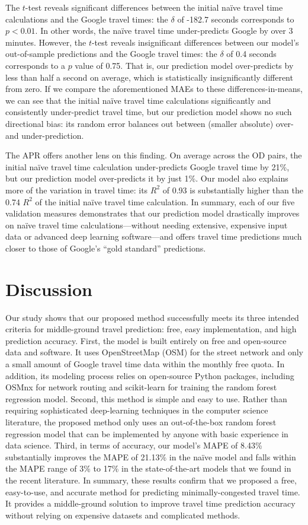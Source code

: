 \documentclass[12pt,letterpaper]{article} %
\begin{document}
    The $t$-test reveals significant differences between the initial naïve travel time calculations and the Google travel times: the $\delta$ of -182.7 seconds corresponds to $p<0.01$. In other words, the naïve travel time under-predicts Google by over 3 minutes. However, the $t$-test reveals insignificant differences between our model's out-of-sample predictions and the Google travel times: the $\delta$ of 0.4 seconds corresponds to a $p$ value of 0.75. That is, our prediction model over-predicts by less than half a second on average, which is statistically insignificantly different from zero. If we compare the aforementioned MAEs to these differences-in-means, we can see that the initial naïve travel time calculations significantly and consistently under-predict travel time, but our prediction model shows no such directional bias: its random error balances out between (smaller absolute) over-and under-prediction.

    The APR offers another lens on this finding. On average across the OD pairs, the initial naïve travel time calculation under-predicts Google travel time by 21\%, but our prediction model over-predicts it by just 1\%. Our model also explains more of the variation in travel time: its $R^2$ of 0.93 is substantially higher than the 0.74 $R^2$ of the initial naïve travel time calculation. In summary, each of our five validation measures demonstrates that our prediction model drastically improves on naïve travel time calculations---without needing extensive, expensive input data or advanced deep learning software---and offers travel time predictions much closer to those of Google's \enquote{gold standard} predictions.

    \section{Discussion}
    Our study shows that our proposed method successfully meets its three intended criteria for middle-ground travel prediction: free, easy implementation, and high prediction accuracy. First, the model is built entirely on free and open-source data and software. It uses OpenStreetMap (OSM) for the street network and only a small amount of Google travel time data within the monthly free quota. In addition, its modeling process relies on open-source Python packages, including OSMnx for network routing and scikit-learn for training the random forest regression model. Second, this method is simple and easy to use. Rather than requiring sophisticated deep-learning techniques in the computer science literature, the proposed method only uses an out-of-the-box random forest regression model that can be implemented by anyone with basic experience in data science. Third, in terms of accuracy, our model's MAPE of 8.43\% substantially improves the MAPE of 21.13\% in the naïve model and falls within the MAPE range of 3\% to 17\% in the state-of-the-art models that we found in the recent literature. In summary, these results confirm that we proposed a free, easy-to-use, and accurate method for predicting minimally-congested travel time. It provides a middle-ground solution to improve travel time prediction accuracy without relying on expensive datasets and complicated methods.
\end{document}
